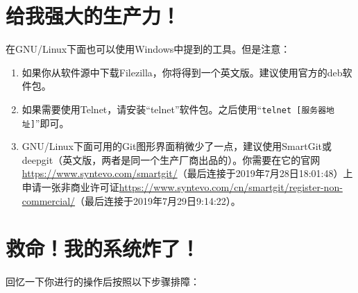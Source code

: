 \section{给我强大的生产力！}
在GNU/Linux下面也可以使用Windows中提到的工具。但是注意：
\begin{enumerate}
	\item 如果你从软件源中下载Filezilla，你将得到一个英文版。建议使用官方的deb软件包。
	\item 如果需要使用Telnet，请安装“telnet”软件包。之后使用“\verb|telnet [服务器地址]|”即可。
	\item GNU/Linux下面可用的Git图形界面稍微少了一点，建议使用SmartGit或deepgit（英文版，两者是同一个生产厂商出品的）。你需要在它的官网\url{https://www.syntevo.com/smartgit/}（最后连接于2019年7月28日18:01:48）上申请一张非商业许可证\url{https://www.syntevo.com/cn/smartgit/register-non-commercial/}（最后连接于2019年7月29日9:14:22）。
\end{enumerate}
\section{救命！我的系统炸了！}
回忆一下你进行的操作后按照以下步骤排障：
